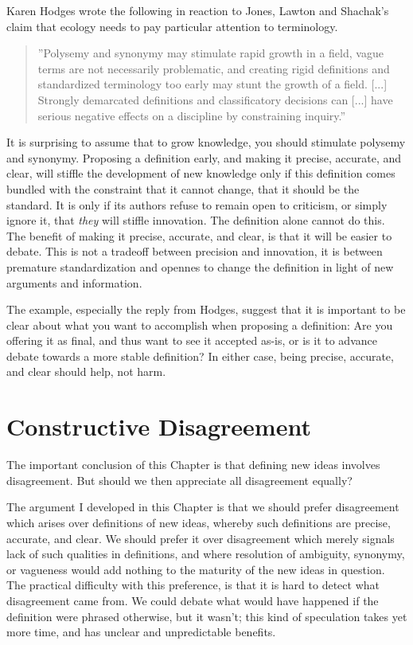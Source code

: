 \documentclass[graybox,envcountchap,sectrefs]{svmono}
\begin{document}
Karen Hodges wrote the following in reaction to Jones, Lawton and Shachak's claim that ecology needs to pay particular attention to terminology.

\begin{quote}
''Polysemy and synonymy may stimulate rapid growth in a field, vague terms are not necessarily problematic, and creating rigid definitions and standardized terminology too early may stunt the growth of a field. [...] Strongly demarcated definitions and classificatory decisions can [...] have serious negative effects on a discipline by constraining inquiry.'' \cite{hodges2008defining}
\end{quote}

It is surprising to assume that to grow knowledge, you should stimulate polysemy and synonymy. Proposing a definition early, and making it precise, accurate, and clear, will stiffle the development of new knowledge only if this definition comes bundled with the constraint that it cannot change, that it should be the standard. It is only if its authors refuse to remain open to criticism, or simply ignore it, that \textit{they} will stiffle innovation. The definition alone cannot do this. The benefit of making it precise, accurate, and clear, is that it will be easier to debate. This is not a tradeoff between precision and innovation, it is between premature standardization and opennes to change the definition in light of new arguments and information. 

The example, especially the reply from Hodges, suggest that it is important to be clear about what you want to accomplish when proposing a definition: Are you offering it as final, and thus want to see it accepted as-is, or is it to advance debate towards a more stable definition? In either case, being precise, accurate, and clear should help, not harm.


\section{Constructive Disagreement}\label{s:constructive-disagreement}
The important conclusion of this Chapter is that defining new ideas involves disagreement. But should we then appreciate all disagreement equally? 

The argument I developed in this Chapter is that we should prefer disagreement which arises over definitions of new ideas, whereby such definitions are precise, accurate, and clear. We should prefer it over disagreement which merely signals lack of such qualities in definitions, and where resolution of ambiguity, synonymy, or vagueness would add nothing to the maturity of the new ideas in question. The practical difficulty with this preference, is that it is hard to detect what disagreement came from. We could debate what would have happened if the definition were phrased otherwise, but it wasn't; this kind of speculation takes yet more time, and has unclear and unpredictable benefits.
\end{document}
